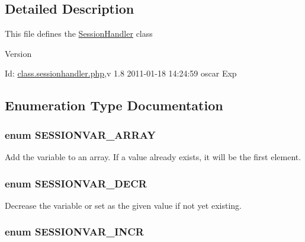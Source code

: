 \subsection{Detailed Description}
This file defines the \hyperlink{classSessionHandler}{SessionHandler} class \begin{DoxyVersion}{Version}

\end{DoxyVersion}
\begin{DoxyParagraph}{Id:}
\hyperlink{class_8sessionhandler_8php}{class.sessionhandler.php},v 1.8 2011-\/01-\/18 14:24:59 oscar Exp 
\end{DoxyParagraph}


\subsection{Enumeration Type Documentation}
\subsubsection[{SESSIONVAR\_\-ARRAY}]{\setlength{\rightskip}{0pt plus 5cm}enum {\bf SESSIONVAR\_\-ARRAY}}\label{class_8sessionhandler_8php_a37ebf617beca75ce8d60f06b8c37423a}


Add the variable to an array. If a value already exists, it will be the first element. 

\subsubsection[{SESSIONVAR\_\-DECR}]{\setlength{\rightskip}{0pt plus 5cm}enum {\bf SESSIONVAR\_\-DECR}}\label{class_8sessionhandler_8php_a25d82db99af8d3372efbccb0917f33cb}


Decrease the variable or set as the given value if not yet existing. 

\subsubsection[{SESSIONVAR\_\-INCR}]{\setlength{\rightskip}{0pt plus 5cm}enum {\bf SESSIONVAR\_\-INCR}}\label{class_8sessionhandler_8php_acf42fdbedc1bd30daaebadb12f63c75c}


